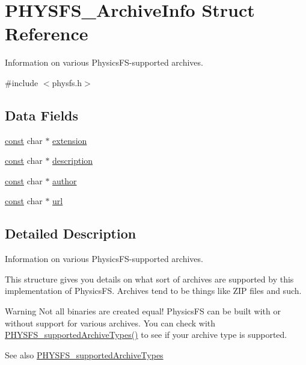 \hypertarget{struct_p_h_y_s_f_s___archive_info}{}\section{P\+H\+Y\+S\+F\+S\+\_\+\+Archive\+Info Struct Reference}
\label{struct_p_h_y_s_f_s___archive_info}


Information on various Physics\+F\+S-\/supported archives.  




{\ttfamily \#include $<$physfs.\+h$>$}

\subsection*{Data Fields}
\begin{DoxyCompactItemize}
\item 
\hyperlink{zconf_8h_a2c212835823e3c54a8ab6d95c652660e}{const} char $\ast$ \hyperlink{struct_p_h_y_s_f_s___archive_info_afedfd22d607fe194bbc6ae9bda021342}{extension}
\item 
\hyperlink{zconf_8h_a2c212835823e3c54a8ab6d95c652660e}{const} char $\ast$ \hyperlink{struct_p_h_y_s_f_s___archive_info_aa544edc050c4b8bea6cf6a0385aba736}{description}
\item 
\hyperlink{zconf_8h_a2c212835823e3c54a8ab6d95c652660e}{const} char $\ast$ \hyperlink{struct_p_h_y_s_f_s___archive_info_a359cd08b6f06b3845234e4cd06501ea2}{author}
\item 
\hyperlink{zconf_8h_a2c212835823e3c54a8ab6d95c652660e}{const} char $\ast$ \hyperlink{struct_p_h_y_s_f_s___archive_info_a2b54ca7e3dd183f133c83eeab8399f9f}{url}
\end{DoxyCompactItemize}


\subsection{Detailed Description}
Information on various Physics\+F\+S-\/supported archives. 

This structure gives you details on what sort of archives are supported by this implementation of Physics\+FS. Archives tend to be things like Z\+IP files and such.

\begin{DoxyWarning}{Warning}
Not all binaries are created equal! Physics\+FS can be built with or without support for various archives. You can check with \hyperlink{physfs_8h_a4ca65fbaa485d68113912bbbd70bd19e}{P\+H\+Y\+S\+F\+S\+\_\+supported\+Archive\+Types()} to see if your archive type is supported.
\end{DoxyWarning}
\begin{DoxySeeAlso}{See also}
\hyperlink{physfs_8h_a4ca65fbaa485d68113912bbbd70bd19e}{P\+H\+Y\+S\+F\+S\+\_\+supported\+Archive\+Types} 
\end{DoxySeeAlso}


